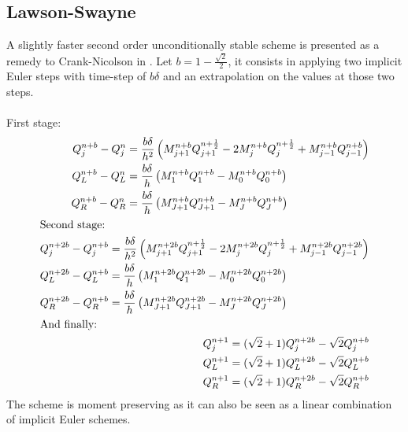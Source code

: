 \documentclass[]{rAMF2e}
\begin{document}
\subsection{Lawson-Swayne}
A slightly faster second order unconditionally stable scheme is presented as a remedy to Crank-Nicolson in \citep{lawson1976simple, lawson1978extrapolation}. Let $b=1-\frac{\sqrt{2}}{2}$, it consists in applying two implicit Euler steps with time-step of $b\delta$ and an extrapolation on the values at those two steps.\\
\\
First stage:
\begin{align}\label{eqn_lawson_swayne}
\begin{split}
Q_j^{n+b}-Q_j^n &= \frac{b\delta}{h^2} \left(M_{j+1}^{n+b}Q_{j+1}^{n+\frac{1}{2}}-2M_j^{n+b}Q_j^{n+\frac{1}{2}}+M_{j-1}^{n+b}Q_{j-1}^{n+b} \right) \\
Q_L^{n+b}-Q_L^n &= \frac{b\delta}{h} \left(M_{1}^{n+b}Q_{1}^{n+b}-M_0^{n+b}Q_0^{n+b}\right) \\
Q_R^{n+b}-Q_R^n &= \frac{b\delta}{h} \left(M_{J+1}^{n+b}Q_{J+1}^{n+b}-M_J^{n+b}Q_J^{n+b}\right)
\end{split}\\
\intertext{Second stage:}
\begin{split}
Q_j^{n+2b}-Q_j^{n+b} &= \frac{b\delta}{h^2} \left(M_{j+1}^{n+2b}Q_{j+1}^{n+\frac{1}{2}}-2M_j^{n+2b}Q_j^{n+\frac{1}{2}}+M_{j-1}^{n+2b}Q_{j-1}^{n+2b} \right) \\
Q_L^{n+2b}-Q_L^{n+b} &= \frac{b\delta}{h} \left(M_{1}^{n+2b}Q_{1}^{n+2b}-M_0^{n+2b}Q_0^{n+2b}\right) \\
Q_R^{n+2b}-Q_R^{n+b} &= \frac{b\delta}{h} \left(M_{J+1}^{n+2b}Q_{J+1}^{n+2b}-M_J^{n+2b}Q_J^{n+2b}\right)
\end{split}\\
\intertext{And finally:}
\begin{split}
Q_j^{n+1} &= (\sqrt{2}+1) Q_j^{n+2b} - \sqrt{2}Q_j^{n+b}\\
Q_L^{n+1} &= (\sqrt{2}+1) Q_L^{n+2b} - \sqrt{2} Q_L^{n+b}\\
Q_R^{n+1} &= (\sqrt{2}+1)  Q_R^{n+2b} - \sqrt{2} Q_R^{n+b}
\end{split}
\end{align}
The scheme is moment preserving as it can also be seen as a linear combination of implicit Euler schemes.
\end{document}
